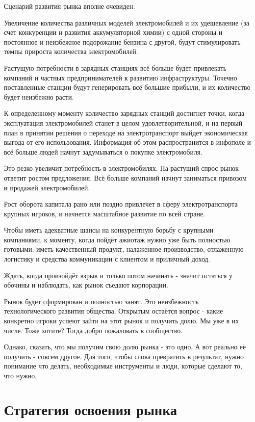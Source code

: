 \documentclass[a4paper,12pt]{report}
\begin{document}
Сценарий развития рынка вполне очевиден. 

Увеличение количества различных моделей электромобилей и их удешевление (за счет конкуренции и развития аккумуляторной химии) с одной стороны и постоянное и неизбежное подорожание бензина с другой, будут стимулировать темпы прироста количества электромобилей. 

Растущую потребности в зарядных станциях всё больше будет привлекать компаний и частных предпринимателей к развитию инфраструктуры. Точечно поставленные станции будут генерировать всё большие прибыли, и их количество будет неизбежно расти. 

К определенному моменту количество зарядных станций достигнет точки, когда эксплуатация электромобилей станет в целом удовлетворительной, и на первый план в принятии решения о переходе на электротранспорт выйдет экономическая выгода от его использования. Информация об этом распространится в инфополе и всё больше людей начнут задумываться о покупке электромобиля.

Это резко увеличит потребность в электромобилях. На растущий спрос рынок ответит ростом предложения. Всё больше компаний начнут заниматься привозом и продажей электромобилей. 

Рост оборота капитала рано или поздно привлечет в сферу электротранспорта крупных игроков, и начнется масштабное развитие по всей стране.

Чтобы иметь адекватные шансы на конкурентную борьбу с крупными компаниями, к моменту, когда пойдёт ажиотаж нужно уже быть полностью готовыми: иметь качественный продукт, налаженное производство, отлаженную логистику и средства коммуникации с клиентом и приличный доход. 

Ждать, когда произойдёт взрыв и только потом начинать - значит остаться у обочины и наблюдать, как рынок съедают корпорации.

Рынок будет сформирован и полностью занят. Это неизбежность технологического развития общества. Открытым остаётся вопрос - какие конкретно игроки успеют зайти на этот рынок и получить долю. Мы уже в их числе. Тоже хотите? Тогда добро пожаловать в сообщество. 

Однако, сказать, что мы получим свою долю рынка - это одно. А вот реально её получить - совсем другое. Для того, чтобы слова превратить в результат, нужно понимание что делать, необходимые инструменты и люди, которые сделают то, что нужно. 

\chapter{Стратегия освоения рынка}
\end{document}
